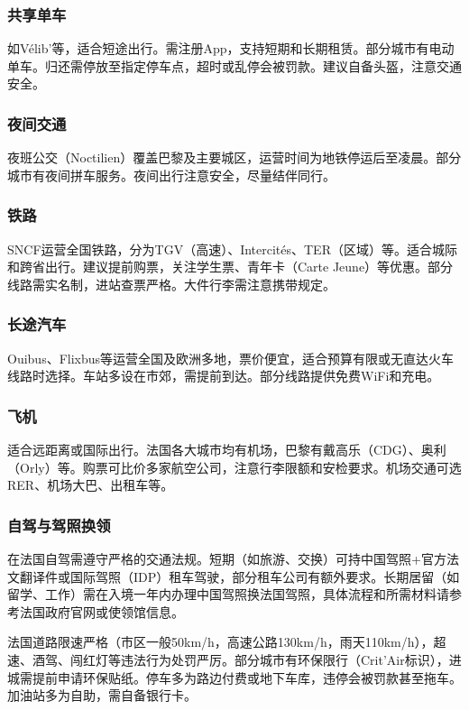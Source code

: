 \subsubsection{共享单车}
如Vélib’等，适合短途出行。需注册App，支持短期和长期租赁。部分城市有电动单车。归还需停放至指定停车点，超时或乱停会被罚款。建议自备头盔，注意交通安全。

\subsubsection{夜间交通}
夜班公交（Noctilien）覆盖巴黎及主要城区，运营时间为地铁停运后至凌晨。部分城市有夜间拼车服务。夜间出行注意安全，尽量结伴同行。

\subsubsection{铁路}
SNCF运营全国铁路，分为TGV（高速）、Intercités、TER（区域）等。适合城际和跨省出行。建议提前购票，关注学生票、青年卡（Carte Jeune）等优惠。部分线路需实名制，进站查票严格。大件行李需注意携带规定。

\subsubsection{长途汽车}
Ouibus、Flixbus等运营全国及欧洲多地，票价便宜，适合预算有限或无直达火车线路时选择。车站多设在市郊，需提前到达。部分线路提供免费WiFi和充电。

\subsubsection{飞机}
适合远距离或国际出行。法国各大城市均有机场，巴黎有戴高乐（CDG）、奥利（Orly）等。购票可比价多家航空公司，注意行李限额和安检要求。机场交通可选RER、机场大巴、出租车等。

\subsubsection{自驾与驾照换领}
在法国自驾需遵守严格的交通法规。短期（如旅游、交换）可持中国驾照+官方法文翻译件或国际驾照（IDP）租车驾驶，部分租车公司有额外要求。长期居留（如留学、工作）需在入境一年内办理中国驾照换法国驾照，具体流程和所需材料请参考法国政府官网或使领馆信息。

法国道路限速严格（市区一般50km/h，高速公路130km/h，雨天110km/h），超速、酒驾、闯红灯等违法行为处罚严厉。部分城市有环保限行（Crit'Air标识），进城需提前申请环保贴纸。停车多为路边付费或地下车库，违停会被罚款甚至拖车。加油站多为自助，需自备银行卡。

